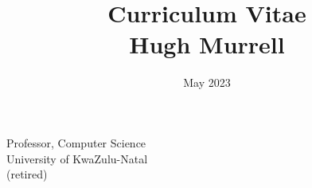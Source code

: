 \documentclass[12pt]{article}
\title{ Curriculum Vitae \\
           Hugh Murrell \\
        \vspace{0.5cm} }
\date{May 2023}
\begin{document}
\maketitle


\begin{figure}[ht]
\end{figure}
\begin{flushright}
\vspace{1.5cm}
\vspace{0.5cm}
Professor, Computer Science  \\ 
University of KwaZulu-Natal \\
(retired) \\

\end{flushright}

\newpage


\newpage

\newpage

\newpage

\newpage





\newpage

\newpage

\end{document}
